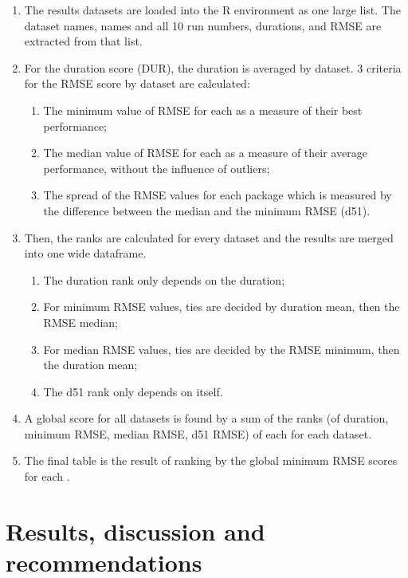 \begin{enumerate}
\def\labelenumi{\arabic{enumi}.}
\tightlist
\item
  The results datasets are loaded into the \textsf{R} environment as one
  large list. The dataset names,  names and all
  10 run numbers, durations, and RMSE are extracted from that list.
\item
  For the duration score (DUR), the duration is averaged by dataset. 3
  criteria for the RMSE score by dataset are calculated:

  \begin{enumerate}
  \def\labelenumii{\alph{enumii}.}
  \tightlist
  \item
    The minimum value of RMSE for each  as a
    measure of their best performance;
  \item
    The median value of RMSE for each  as a
    measure of their average performance, without the influence of
    outliers;
  \item
    The spread of the RMSE values for each package which is measured by
    the difference between the median and the minimum RMSE (d51).
  \end{enumerate}
\item
  Then, the ranks are calculated for every dataset and the results are
  merged into one wide dataframe.

  \begin{enumerate}
  \def\labelenumii{\alph{enumii}.}
  \tightlist
  \item
    The duration rank only depends on the duration;
  \item
    For minimum RMSE values, ties are decided by duration mean, then the
    RMSE median;
  \item
    For median RMSE values, ties are decided by the RMSE minimum, then
    the duration mean;
  \item
    The d51 rank only depends on itself.
  \end{enumerate}
\item
  A global score for all datasets is found by a sum of the ranks (of
  duration, minimum RMSE, median RMSE, d51 RMSE) of each
   for each dataset.
\item
  The final table is the result of ranking by the global minimum RMSE
  scores for each .
\end{enumerate}

\hypertarget{results-discussion-and-recommendations}{%
\section{Results, discussion and
recommendations}\label{results-discussion-and-recommendations}}

